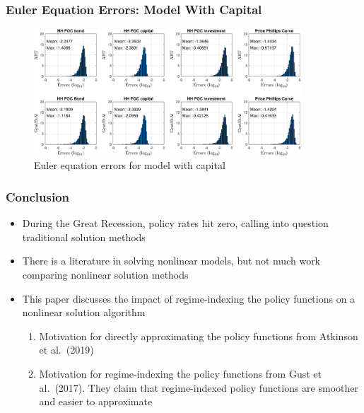 \documentclass[11pt]{beamer}
\begin{document}
\begin{frame}\frametitle{Euler Equation Errors: Model With Capital}
\begin{figure}[H]
    \centering
\captionsetup{justification=centering}
    \includegraphics[width=10cm,scale=.8]{../Paper/eeerrorsCAP.pdf}
  \caption{Euler equation errors for model with capital}    
  \end{figure}
\end{frame}%
\begin{frame}\frametitle{Conclusion}
\begin{itemize}\setlength{\itemsep}{8pt}
\item During the Great Recession, policy rates hit zero, calling into question traditional solution methods
\item There is a literature in solving nonlinear models, but not much work comparing nonlinear solution methods
\item This paper discusses the impact of regime-indexing the policy functions on a nonlinear solution algorithm
\begin{enumerate}\setlength{\itemsep}{4pt}
\item Motivation for directly approximating the policy functions from Atkinson et al.\ (2019)
\item Motivation for regime-indexing the policy functions from Gust et al.\ (2017). They claim that regime-indexed policy functions are smoother and easier to approximate
\end{enumerate}

\end{itemize}
\end{frame}
\end{document}
